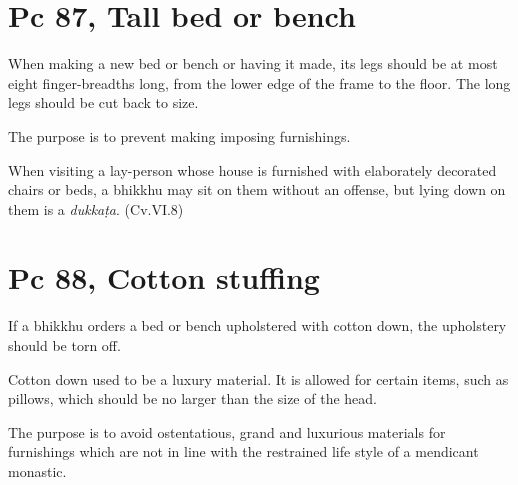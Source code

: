 \section{Pc 87, Tall bed or bench}

When making a new bed or bench or having it made, its legs should be at
most eight finger-breadths long, from the lower edge of the frame to the
floor. The long legs should be cut back to size.

The purpose is to prevent making imposing furnishings.

When visiting a lay-person whose house is furnished with elaborately
decorated chairs or beds, a bhikkhu may sit on them without an offense,
but lying down on them is a \emph{dukkaṭa}. (Cv.VI.8)

\section{Pc 88, Cotton stuffing}

If a bhikkhu orders a bed or bench upholstered with cotton down, the
upholstery should be torn off.

Cotton down used to be a luxury material. It is allowed for certain
items, such as pillows, which should be no larger than the size of the
head.

The purpose is to avoid ostentatious, grand and luxurious materials for
furnishings which are not in line with the restrained life style of a
mendicant monastic.

